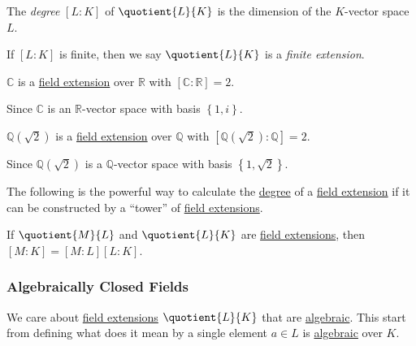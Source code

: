 \begin{definition}[Degree]\label{def:degree}
	The \emph{degree} \([L\colon K]\) of \(\quotient{L}{K} \) is the dimension of the \(K\)-vector space \(L\).
\end{definition}

\begin{notation}
	If \([L\colon K]\) is finite, then we say \(\quotient{L}{K} \) is a \emph{finite extension}.
\end{notation}

\begin{eg}
	\(\mathbb{C} \) is a \hyperref[def:field-extension]{field extension} over \(\mathbb{R} \) with \([\mathbb{C} \colon \mathbb{R} ] = 2\).
\end{eg}
\begin{explanation}
	Since \(\mathbb{C} \) is an \(\mathbb{R} \)-vector space with basis \(\left\{ 1, i \right\} \).
\end{explanation}

\begin{eg}
	\(\mathbb{Q} (\sqrt{2} )\) is a \hyperref[def:field-extension]{field extension} over \(\mathbb{Q} \) with \([\mathbb{Q}(\sqrt{2} ) \colon \mathbb{Q} ] = 2\).
\end{eg}
\begin{explanation}
	Since \(\mathbb{Q}(\sqrt{2} ) \) is a \(\mathbb{Q} \)-vector space with basis \(\left\{ 1, \sqrt{2}  \right\} \).
\end{explanation}

The following is the powerful way to calculate the \hyperref[def:degree]{degree} of a \hyperref[def:field-extension]{field extension} if it can be constructed by a ``tower'' of \hyperref[def:field-extension]{field extensions}.

\begin{theorem}\label{thm:field-tower-degree}
	If \(\quotient{M}{L} \) and \(\quotient{L}{K} \) are \hyperref[def:field-extension]{field extensions}, then \([M\colon K] = [M \colon L] [L \colon K]\).
\end{theorem}

\subsubsection{Algebraically Closed Fields}
We care about \hyperref[def:field-extension]{field extensions} \(\quotient{L}{K} \) that are \hyperref[def:algebraic-extension]{algebraic}. This start from defining what does it mean by a single element \(a\in L\)  is \hyperref[def:algebraic]{algebraic} over \(K\).

